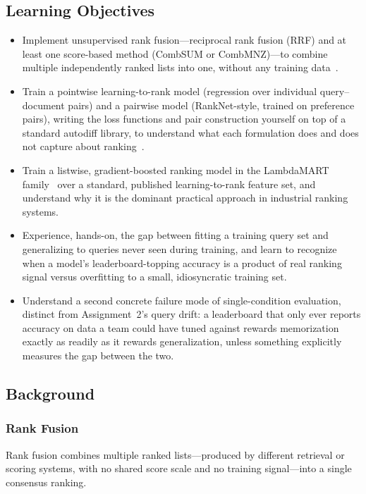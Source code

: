 \documentclass[10pt]{article}
\begin{document}
\subsection{Learning Objectives}
\begin{itemize}
  \item Implement unsupervised rank fusion---reciprocal rank fusion (RRF) and at least one score-based method (CombSUM or CombMNZ)---to combine multiple independently ranked lists into one, without any training data~\cite{cormack2009,foxshaw1994}.
  \item Train a pointwise learning-to-rank model (regression over individual query--document pairs) and a pairwise model (RankNet-style, trained on preference pairs), writing the loss functions and pair construction yourself on top of a standard autodiff library, to understand what each formulation does and does not capture about ranking~\cite{liu2009}.
  \item Train a listwise, gradient-boosted ranking model in the LambdaMART family~\cite{burges2010,wu2010} over a standard, published learning-to-rank feature set, and understand why it is the dominant practical approach in industrial ranking systems.
  \item Experience, hands-on, the gap between fitting a training query set and generalizing to queries never seen during training, and learn to recognize when a model's leaderboard-topping accuracy is a product of real ranking signal versus overfitting to a small, idiosyncratic training set.
  \item Understand a second concrete failure mode of single-condition evaluation, distinct from Assignment~2's query drift: a leaderboard that only ever reports accuracy on data a team could have tuned against rewards memorization exactly as readily as it rewards generalization, unless something explicitly measures the gap between the two.
\end{itemize}

\subsection{Background}

\subsubsection{Rank Fusion}

Rank fusion combines multiple ranked lists---produced by different retrieval or scoring systems, with no shared score scale and no training signal---into a single consensus ranking.
\end{document}
